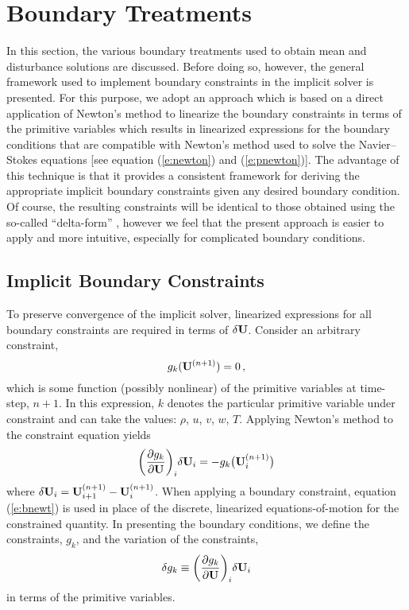 \section{Boundary Treatments}

In this section, the various boundary treatments used to obtain mean and
disturbance solutions are discussed.  Before doing so, however, the general
framework used to implement boundary constraints in the implicit solver is
presented.  For this purpose, we adopt an approach which is based on a direct
application of Newton's method to linearize the boundary constraints in terms
of the primitive variables which results in linearized expressions for
the boundary conditions that are compatible with Newton's method used to
solve the Navier--Stokes equations [see equation (\ref{e:newton}) and
(\ref{e:pnewton})].  The advantage of this technique is that it provides a
consistent framework for deriving the appropriate implicit boundary constraints
given any desired boundary condition.  Of course, the resulting constraints
will be identical to those obtained using the so-called ``delta-form''
\cite{Hirsch:90}, however we feel that the present approach is easier to
apply and more intuitive, especially for complicated boundary conditions.

\subsection{Implicit Boundary Constraints}

To preserve convergence of the implicit solver, linearized expressions for all
boundary constraints are required in terms of $\delta{\bf U}$.  Consider an
arbitrary constraint, 
%
\begin{equation}
  g_k({\bf U}^{(n+1)}) = 0 {\, ,}
\end{equation}
%
which is some function (possibly nonlinear) of the primitive variables at
time-step, $n+1$.  In this expression, $k$ denotes the particular primitive
variable under constraint and can take the values: $\rho$, $u$, $v$, $w$, $T$.
Applying Newton's method to the constraint equation yields
%
\begin{equation} \label{e:bnewt}
  \bigg(\frac{\partial g_k}{\partial {\bf U}}\bigg)_{i} \delta {\bf U}_{i} = 
  -g_k\big({\bf U}^{(n+1)}_{i}\big)
\end{equation}
%
where $\delta {\bf U}_{i} = {\bf U}^{(n+1)}_{i+1} - {\bf U}^{(n+1)}_{i}$.  When applying a
boundary constraint, equation (\ref{e:bnewt}) is used in place of the
discrete, linearized equations-of-motion for the constrained quantity.  In
presenting the boundary conditions, we define the constraints, $g_k$, and the
variation of the constraints,
%
\begin{equation}
  \delta g_k \equiv \bigg(\frac{\partial g_k}{\partial {\bf U}}\bigg)_{i} 
                    \delta {\bf U}_{i}
\end{equation}
%
in terms of the primitive variables.

